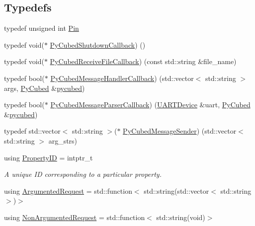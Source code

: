 \subsection*{Typedefs}
\begin{DoxyCompactItemize}
\item 
typedef unsigned int \hyperlink{namespacecubesat_af928ed4b56ef60d75953a91225b37a00}{Pin}
\item 
typedef void($\ast$ \hyperlink{namespacecubesat_abcc8eedef699fb7e3f433200cc25e181}{Py\+Cubed\+Shutdown\+Callback}) ()
\item 
typedef void($\ast$ \hyperlink{namespacecubesat_a378b098737c521b2e13df70ad8ddc0ba}{Py\+Cubed\+Receive\+File\+Callback}) (const std\+::string \&file\+\_\+name)
\item 
typedef bool($\ast$ \hyperlink{namespacecubesat_a3b98f17d41bf0e37fe0d382b897f9692}{Py\+Cubed\+Message\+Handler\+Callback}) (std\+::vector$<$ std\+::string $>$ args, \hyperlink{classcubesat_1_1PyCubed}{Py\+Cubed} \&\hyperlink{pycubed__test_8cpp_ae8c4c37e7742557f28bffebe72eeef5e}{pycubed})
\item 
typedef bool($\ast$ \hyperlink{namespacecubesat_ad7197c1bfb09998ced84827cb0dd1680}{Py\+Cubed\+Message\+Parser\+Callback}) (\hyperlink{classcubesat_1_1UARTDevice}{U\+A\+R\+T\+Device} \&uart, \hyperlink{classcubesat_1_1PyCubed}{Py\+Cubed} \&\hyperlink{pycubed__test_8cpp_ae8c4c37e7742557f28bffebe72eeef5e}{pycubed})
\item 
typedef std\+::vector$<$ std\+::string $>$($\ast$ \hyperlink{namespacecubesat_a0cd8f3b1ff80acfd36cac73e8eb12b88}{Py\+Cubed\+Message\+Sender}) (std\+::vector$<$ std\+::string $>$ arg\+\_\+strs)
\item 
using \hyperlink{namespacecubesat_ab5c769503b8a77bc90a47ca8705f2f86}{Property\+ID} = intptr\+\_\+t
\begin{DoxyCompactList}\small\item\em A unique ID corresponding to a particular property. \end{DoxyCompactList}\item 
using \hyperlink{namespacecubesat_a4fb5bf4788a49408c2c979bb82ae4fe1}{Argumented\+Request} = std\+::function$<$ std\+::string(std\+::vector$<$ std\+::string $>$)$>$
\item 
using \hyperlink{namespacecubesat_a494b2feec3d999510e5772da5c0b354c}{Non\+Argumented\+Request} = std\+::function$<$ std\+::string(void)$>$
\end{DoxyCompactItemize}
